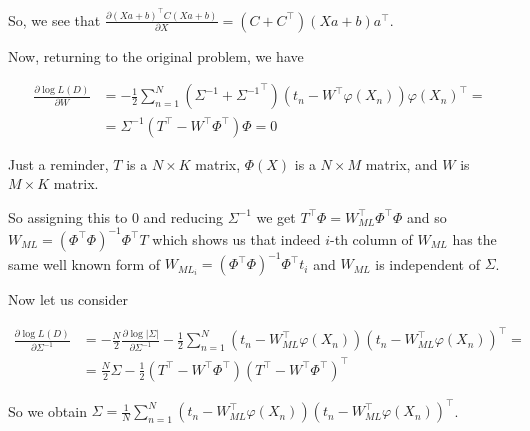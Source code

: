 \documentclass[fleqn]{article}
\begin{document}
So, we see that $\frac{\partial (Xa + b)^\top C (Xa + b)}{\partial X} = (C + C^\top)(Xa + b)a^\top$.

Now, returning to the original problem, we have 

\begin{align}\frac{\partial \log L(D)}{\partial W} & = -\frac{1}{2}\sum\limits_{n=1}^N(\Sigma^{-1} + {\Sigma^{-1}}^{\top})(t_n - W^\top \varphi(X_n))\varphi(X_n)^\top = \\ & = \Sigma^{-1} (T^\top - W^\top \varPhi^\top)\varPhi = 0
\end{align}

Just a reminder, $T$ is a $N \times K$ matrix, $\varPhi(X)$ is a $N \times M$ matrix, and $W$ is $M \times K$ matrix. 

So assigning this to 0 and reducing $\Sigma^{-1}$ we get $T^\top \varPhi = W_{ML}^\top \varPhi^\top \varPhi$ and so $W_{ML} =  (\varPhi^\top \varPhi)^{-1}\varPhi^\top T$ which shows us that indeed $i$-th column of $W_{ML}$ has the same well known form of $W_{ML_i}=(\varPhi^\top \varPhi)^{-1}\varPhi^\top t_i$ and $W_{ML}$ is independent of $\Sigma$.

Now let us consider 

\begin{align}\frac{\partial \log L(D)}{\partial \Sigma^{-1}} & = -\frac{N}{2}\frac{\partial\log|\Sigma|}{\partial\Sigma^{-1}} - \frac{1}{2}\sum\limits_{n=1}^N(t_n - W_{ML}^\top \varphi(X_n))(t_n - W_{ML}^\top \varphi(X_n))^\top = \\ & = \frac{N}{2} \Sigma - \frac{1}{2}(T^\top - W^\top \varPhi^\top)(T^\top - W^\top \varPhi^\top)^\top
\end{align}

So we obtain $\Sigma = \frac{1}{N}\sum\limits_{n=1}^N(t_n - W_{ML}^\top \varphi(X_n))(t_n - W_{ML}^\top \varphi(X_n))^\top$.
\end{document}
